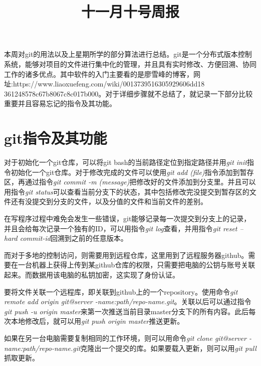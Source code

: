 \documentclass[UTF8]{ctexart}
\title{十一月十号周报}
\date{}
\begin{document}
	本周对git的用法以及上星期所学的部分算法进行总结。git是一个分布式版本控制系统，能够对项目的文件进行集中化的管理，并且具有实时修改、方便回溯、协同工作的诸多优点。其中软件的入门主要看的是廖雪峰的博客，网址:https://www.liaoxuefeng.com/wiki/0013739516305929606dd18
	361248578c67b8067c8c017b000。对于详细步骤就不总结了，就记录一下部分比较重要并且容易忘记的指令及其功能。
	\section{git指令及其功能}
	对于初始化一个git仓库，可以将git bash的当前路径定位到指定路径并用\emph{git init}指令初始化一个git仓库。对于修改完成的文件可以使用\emph{git add (file)}指令添加到暂存区，再通过指令\emph{git commit -m (message)}把修改好的文件添加到分支里。并且可以用指令\emph{git status}可以查看当前分支下的状态，其中包括修改完没提交到暂存区的文件还有没提交到分支的文件，以及分值的文件和当前文件的差别。
	\par
	在写程序过程中难免会发生一些错误，git能够记录每一次提交到分支上的记录，并且会给每次记录一个独有的ID，可以用指令\emph{git log}查看，并用指令\emph{git reset --hard commit-id}回溯到之前的任意版本。
	\par
	而对于多地的控制访问，则需要用到远程仓库，这里用到了远程服务器github。需要在一台机器上获得上传到某github仓库的权限，只需要把电脑的公钥与账号关联起来。而数据用该电脑的私钥加密，这实现了身份认证。
	\par
	要将文件关联一个远程库，即关联到github上的一个repository。使用命令\emph{git remote add origin git@server -name:path/repo-name.git}。关联以后可以通过指令\emph{git push -u origin master}来第一次推送当前目录master分支下的所有内容。此后每次本地修改后，就可以用\emph{git push origin master}推送更新。
	\par
	如果在另一台电脑需要复制相同的工作环境，则可以用命令\emph{git clone git@server -name:path/repo-name.git}克隆出一个提交的库。如果要载入更新，则可以用\emph{git pull}抓取更新。
\end{document}
